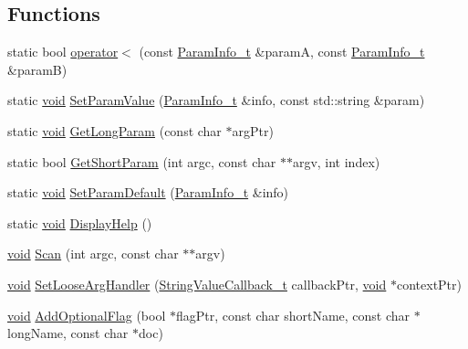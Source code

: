 \subsection*{Functions}
\begin{DoxyCompactItemize}
\item 
static bool \hyperlink{namespacecli_1_1args_a326ae2fc86afa8db30cd993e214f498b}{operator$<$} (const \hyperlink{structcli_1_1args_1_1_param_info__t}{Param\+Info\+\_\+t} \&paramA, const \hyperlink{structcli_1_1args_1_1_param_info__t}{Param\+Info\+\_\+t} \&paramB)
\item 
static \hyperlink{_t_e_m_p_l_a_t_e__cdef_8h_ac9c84fa68bbad002983e35ce3663c686}{void} \hyperlink{namespacecli_1_1args_a30129a4cd3d140fb1cc182963a02252a}{Set\+Param\+Value} (\hyperlink{structcli_1_1args_1_1_param_info__t}{Param\+Info\+\_\+t} \&info, const std\+::string \&param)
\item 
static \hyperlink{_t_e_m_p_l_a_t_e__cdef_8h_ac9c84fa68bbad002983e35ce3663c686}{void} \hyperlink{namespacecli_1_1args_a5b6a6cd347380ccda37a01837f1d5349}{Get\+Long\+Param} (const char $\ast$arg\+Ptr)
\item 
static bool \hyperlink{namespacecli_1_1args_a9a849178c094b7b85f234f8dd07f8938}{Get\+Short\+Param} (int argc, const char $\ast$$\ast$argv, int index)
\item 
static \hyperlink{_t_e_m_p_l_a_t_e__cdef_8h_ac9c84fa68bbad002983e35ce3663c686}{void} \hyperlink{namespacecli_1_1args_ab263ec6ccf5ccbd120c61c57586c1e0c}{Set\+Param\+Default} (\hyperlink{structcli_1_1args_1_1_param_info__t}{Param\+Info\+\_\+t} \&info)
\item 
static \hyperlink{_t_e_m_p_l_a_t_e__cdef_8h_ac9c84fa68bbad002983e35ce3663c686}{void} \hyperlink{namespacecli_1_1args_af0c8ed49a0037cc25e02147997cdea14}{Display\+Help} ()
\item 
\hyperlink{_t_e_m_p_l_a_t_e__cdef_8h_ac9c84fa68bbad002983e35ce3663c686}{void} \hyperlink{namespacecli_1_1args_ac5125992f0664b2f8d8937ec938c99e5}{Scan} (int argc, const char $\ast$$\ast$argv)
\item 
\hyperlink{_t_e_m_p_l_a_t_e__cdef_8h_ac9c84fa68bbad002983e35ce3663c686}{void} \hyperlink{namespacecli_1_1args_a529af5c2d786f52a5e2ea724210ede0d}{Set\+Loose\+Arg\+Handler} (\hyperlink{namespacecli_1_1args_aa08565ab872ff119b0a21d4bbe1d8e4e}{String\+Value\+Callback\+\_\+t} callback\+Ptr, \hyperlink{_t_e_m_p_l_a_t_e__cdef_8h_ac9c84fa68bbad002983e35ce3663c686}{void} $\ast$context\+Ptr)
\item 
\hyperlink{_t_e_m_p_l_a_t_e__cdef_8h_ac9c84fa68bbad002983e35ce3663c686}{void} \hyperlink{namespacecli_1_1args_a29bbfe4f917ebdddc236d07cefed697f}{Add\+Optional\+Flag} (bool $\ast$flag\+Ptr, const char short\+Name, const char $\ast$long\+Name, const char $\ast$doc)

\end{DoxyCompactItemize}
